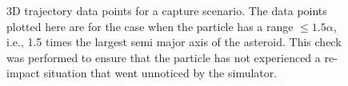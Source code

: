 \begin{figure}[htb]
\centering
\captionsetup{justification=centering}

\caption{3D trajectory data points for a capture scenario. The data points plotted here are for the case when the particle has a range $\leq 1.5\alpha$, i.e., 1.5 times the largest semi major axis of the asteroid. This check was performed to ensure that the particle has not experienced a re-impact situation that went unnoticed by the simulator.}
\label{fig:capture_vv_3d_plot}
\end{figure}
